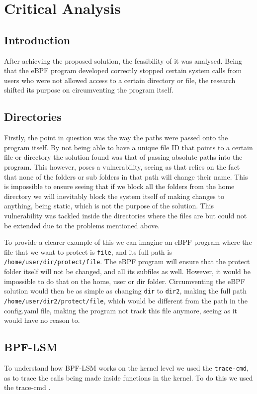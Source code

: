 \chapter{Critical Analysis}

\section{Introduction}
After achieving the proposed solution, the feasibility of it was analysed.
Being that the eBPF program developed correctly stopped certain system calls from users who were not allowed access to a certain directory or file, the research shifted its purpose on circumventing the program itself.


\section{Directories}
Firstly, the point in question was the way the paths were passed onto the program itself. By not being able to have a unique file ID that points to a certain file or directory the solution found was that of passing absolute paths into the program.
This however, poses a vulnerability, seeing as that relies on the fact that none of the folders or sub folders in that path will change their name.
This is impossible to ensure seeing that if we block all the folders from the home directory we will inevitably block the system itself of making changes to anything, being static, which is not the purpose of the solution.
This vulnerability was tackled inside the directories where the files are but could not be extended due to the problems mentioned above.

To provide a clearer example of this we can imagine an eBPF program where the file that we want to protect is \texttt{file}, and its full path is \texttt{/home/user/dir/protect/file}. The eBPF program will ensure that the protect folder itself will not be changed, and all its subfiles as well. However, it would be impossible to do that on the home, user or dir folder. Circumventing the eBPF solution would then be as simple as changing \texttt{dir} to \texttt{dir2}, making the full path \texttt{/home/user/dir2/protect/file}, which would be different from the path in the config.yaml file, making the program not track this file anymore, seeing as it would have no reason to.

\section{BPF-LSM}
To understand how BPF-LSM works on the kernel level we used the \texttt{trace-cmd}, as to trace the calls being made inside functions in the kernel.
To do this we used the trace-cmd \cite{tracecmd}.

